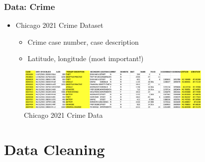 \documentclass{beamer}
\begin{document}
\begin{frame}
	\frametitle{Data: Crime}
	\begin{itemize}
		\item Chicago 2021 Crime Dataset
		\begin{itemize}
			\item Crime case number, case description
			\item Latitude, longitude (most important!)
		\end{itemize}
	\end{itemize}
	\begin{figure}[H]
		\centering
		\includegraphics[height=2cm, width=9.5cm]{figs/crimedata.png}
		\caption{Chicago 2021 Crime Data}
	\end{figure}
\end{frame}



\section{Data Cleaning}
\end{document}
